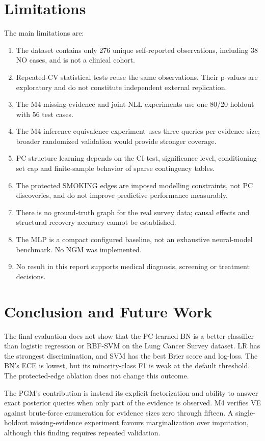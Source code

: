 \documentclass[conference]{IEEEtran}
\begin{document}
\section{Limitations}
The main limitations are:
\begin{enumerate}
\item The dataset contains only 276 unique self-reported observations, including 38 NO cases, and is not a clinical cohort.
\item Repeated-CV statistical tests reuse the same observations. Their p-values are exploratory and do not constitute independent external replication.
\item The M4 missing-evidence and joint-NLL experiments use one 80/20 holdout with 56 test cases.
\item The M4 inference equivalence experiment uses three queries per evidence size; broader randomized validation would provide stronger coverage.
\item PC structure learning depends on the CI test, significance level, conditioning-set cap and finite-sample behavior of sparse contingency tables.
\item The protected SMOKING edges are imposed modelling constraints, not PC discoveries, and do not improve predictive performance measurably.
\item There is no ground-truth graph for the real survey data; causal effects and structural recovery accuracy cannot be established.
\item The MLP is a compact configured baseline, not an exhaustive neural-model benchmark. No NGM was implemented.
\item No result in this report supports medical diagnosis, screening or treatment decisions.
\end{enumerate}

\section{Conclusion and Future Work}
The final evaluation does not show that the PC-learned BN is a better classifier than logistic regression or RBF-SVM on the Lung Cancer Survey dataset. LR has the strongest discrimination, and SVM has the best Brier score and log-loss. The BN's ECE is lowest, but its minority-class F1 is weak at the default threshold. The protected-edge ablation does not change this outcome.

The PGM's contribution is instead its explicit factorization and ability to answer exact posterior queries when only part of the evidence is observed. M4 verifies VE against brute-force enumeration for evidence sizes zero through fifteen. A single-holdout missing-evidence experiment favours marginalization over imputation, although this finding requires repeated validation.
\end{document}

